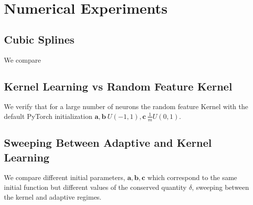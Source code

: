 \section{Numerical Experiments}

\subsection{Cubic Splines}
We compare 
\subsection{Kernel Learning vs Random Feature Kernel}
We verify that for a large number of neurons the random feature Kernel with the default PyTorch initialization $\bm a, \bm b ~ U(-1, 1), \bm c ~ \frac{1}{m}U(0, 1)$.

\subsection{Sweeping Between Adaptive and Kernel Learning}
We compare different initial parameters, $\bm a, \bm b, \bm c$ which correspond to the same initial function but different values of the conserved quantity $\delta$, sweeping between the kernel and adaptive regimes.


